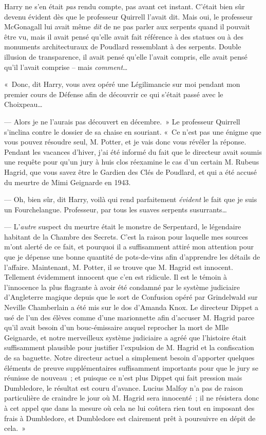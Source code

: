 Harry ne s'en était \emph{pas} rendu compte, pas avant cet instant.
C'était bien sûr devenu évident dès que le professeur Quirrell l'avait dit.
Mais oui, le professeur McGonagall lui avait même \emph{dit} de ne pas parler aux serpents quand il pouvait être vu, mais il avait pensé qu'elle avait fait référence à des statues ou à des monuments architecturaux de Poudlard ressemblant à des serpents.
Double illusion de transparence, il avait pensé qu'elle l'avait compris, elle avait pensé qu'il l'avait comprise -- mais \emph{comment}…

«~Donc, dit Harry, vous avez opéré une Légilimancie sur moi pendant mon premier cours de Défense afin de découvrir ce qui s'était passé avec le Choixpeau…

--- Alors je ne l'aurais pas découvert en décembre.~»
Le professeur Quirrell s'inclina contre le dossier de sa chaise en souriant.
«~Ce n'est pas une énigme que vous pouvez résoudre seul, M. Potter, et je vais donc vous révéler la réponse.
Pendant les vacances d'hiver, j'ai été informé du fait que le directeur avait soumis une requête pour qu'un jury à huis clos réexamine le cas d'un certain M. Rubeus Hagrid, que vous savez être le Gardien des Clés de Poudlard, et qui a été accusé du meurtre de Mimi Geignarde en 1943.

--- Oh, bien sûr, dit Harry, voilà qui rend parfaitement \emph{évident} le fait que je suis un Fourchelangue.
Professeur, par tous les suaves serpents susurrants…

--- L'\emph{autre} suspect du meurtre était le monstre de Serpentard, le légendaire habitant de la Chambre des Secrets.
C'est la raison pour laquelle mes sources m'ont alerté de ce fait, et pourquoi il a suffisamment attiré mon attention pour que je dépense une bonne quantité de pots-de-vins afin d'apprendre les détails de l'affaire.
Maintenant, M. Potter, il se trouve que M. Hagrid est innocent.
Tellement évidemment innocent que c'en est ridicule.
Il est le témoin à l'innocence la plus flagrante à avoir été condamné par le système judiciaire d'Angleterre magique depuis que le sort de Confusion opéré par Grindelwald sur Neville Chamberlain a été mis sur le dos d'Amanda Knox.
Le directeur Dippet a usé de l'un des élèves comme d'une marionnette afin d'accuser M. Hagrid parce qu'il avait besoin d'un bouc-émissaire auquel reprocher la mort de Mlle Geignarde, et notre merveilleux système judiciaire a agréé que l'histoire était suffisamment plausible pour justifier l'expulsion de M. Hagrid et la confiscation de sa baguette.
Notre directeur actuel a simplement besoin d'apporter quelques éléments de preuve supplémentaires suffisamment importants pour que le jury se réunisse de nouveau~; et puisque ce n'est plus Dippet qui fait pression mais Dumbledore, le résultat est couru d'avance.
Lucius Malfoy n'a pas de raison particulière de craindre le jour où M. Hagrid sera innocenté~; il ne résistera donc à cet appel que dans la mesure où cela ne lui coûtera rien tout en imposant des frais à Dumbledore, et Dumbledore est clairement prêt à poursuivre en dépit de cela.~»

